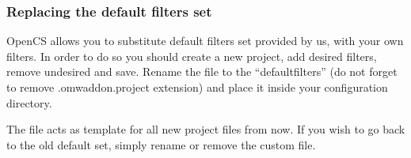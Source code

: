 \subsubsection{Replacing the default filters set}
OpenCS allows you to substitute default filters set provided by us, with your own filters. In order to do so you should create a new project,
add desired filters, remove undesired and save. Rename the file to the ``defaultfilters'' (do not forget to remove .omwaddon.project extension)
and place it inside your configuration directory.

The file acts as template for all new project files from now. If you wish to go back to the old default set, simply rename or remove the custom file.
